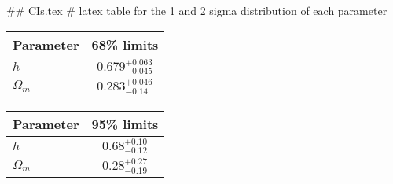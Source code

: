 ## CIs.tex
# latex table for the 1 and 2 sigma distribution of each parameter

\begin{tabular} { l  c}
 Parameter &  68\% limits\\
\hline
{\boldmath$h              $} & $0.679^{+0.063}_{-0.045}   $\\
{\boldmath$\Omega_m       $} & $0.283^{+0.046}_{-0.14}    $\\
\hline
\end{tabular}

\begin{tabular} { l  c}
 Parameter &  95\% limits\\
\hline
{\boldmath$h              $} & $0.68^{+0.10}_{-0.12}      $\\
{\boldmath$\Omega_m       $} & $0.28^{+0.27}_{-0.19}      $\\
\hline
\end{tabular}
